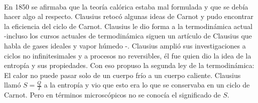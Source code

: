 \\
En 1850 se afirmaba que la teoría calórica estaba mal formulada y que se debía hacer algo al respecto. Clausius retocó algunas ideas de Carnot y pudo encontrar la eficiencia del ciclo de Carnot. Clausius le dio forma a la termodinámica actual -incluso los cursos actuales de termodinámica siguen un artículo de Clausius que habla de gases ideales y vapor húmedo \cite{MullerHistory}-. Clausius amplió sus investigaciones a ciclos no infinitesimales y a procesos no reversibles, él fue quien dio la idea de la entropía y sus propiedades. Con eso propuso la segunda ley de la termodinámica: El calor no puede pasar solo de un cuerpo frío a un cuerpo caliente. Clausius llamó $S=\frac{Q}{T}$ a la entropía y vio que esto era lo que se conservaba en un ciclo de Carnot. Pero en términos microscópicos no se conocía el significado de $S$.
\\

